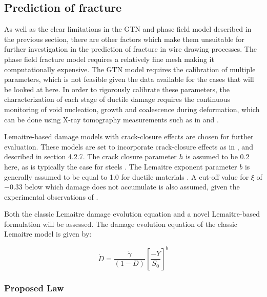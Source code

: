 \documentclass[sn-mathphys,Numbered,draft]{sn-jnl}%
\begin{document}
\subsection{Prediction of fracture}

As well as the clear limitations in the GTN and phase field model described in the previous section, there are other factors which make them unsuitable for further investigation in the prediction of fracture in wire drawing processes. The phase field fracture model requires a relatively fine mesh \cite{borden_phase-field_2016} making it computationally expensive. The GTN model requires the calibration of multiple parameters, which is not feasible given the data available for the cases that will be looked at here. In order to rigorously calibrate these parameters, the characterization of each stage of ductile damage requires the continuous monitoring of void nucleation, growth and coalescence during
deformation, which can be done using X-ray tomography measurements such as in \citet{thuillier_ductile_2012} and \citet{fansi_numerical_2013}. 

Lemaitre-based damage models with crack-closure effects are chosen for further evaluation. These models are set to incorporate crack-closure effects as in \citet{pires_issues_2005,teixeira_ductile_2010}, and described in section 4.2.7. The crack closure parameter $h$ is assumed to be $0.2$ here, as is typically the case for steels \cite{desmorat_modeling_2008,lemaitre_course_1996,bouchard_enhanced_2011}. The Lemaitre exponent parameter $b$ is generally assumed to be equal to 1.0 for ductile materials \cite{lemaitre_continuous_1985,malcher_improved_2014}. A cut-off value  for $\xi$ of $-0.33$ below which damage does not accumulate is also assumed, given the experimental observations of \citet{bao_cut-off_2005}.

Both the classic Lemaitre \cite{lemaitre_continuous_1985} damage evolution equation and a novel Lemaitre-based formulation will be assessed. The damage evolution equation of the classic Lemaitre model is given by:

\begin{equation}
	\dot{D}=\frac{\dot{\gamma}}{\left(1-D\right)}\left[\frac{-Y}{S_0}\right]^b
\end{equation}

\subsubsection{Proposed Law}
\end{document}
